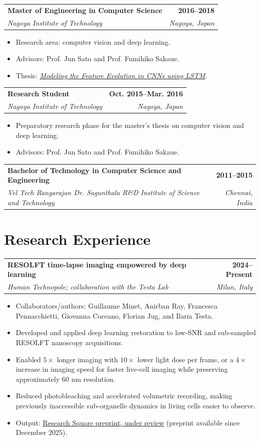 \documentclass[11pt,a4paper]{article}
\makeatletter
\newcommand{\entry}[4]{%
  \begin{tabularx}{\linewidth}{@{}>{\raggedright\arraybackslash}X r@{}}
    \textbf{#1} & \textbf{#2} \\
    \textit{#3} & \textit{#4}
  \end{tabularx}\vspace{-2pt}
}
\makeatother
\begin{document}
\entry{Master of Engineering in Computer Science}{2016--2018}{Nagoya Institute of Technology}{Nagoya, Japan}
\begin{itemize}
  \item Research area: computer vision and deep learning.
  \item Advisors: Prof. Jun Sato and Prof. Fumihiko Sakaue.
  \item Thesis: \href{https://drive.google.com/file/d/1A7Gm2RS3L8SPyb9G9Ey5O350kh7DYZKk/view}{\textit{Modeling the Feature Evolution in CNNs using LSTM}}.
\end{itemize}

\entry{Research Student}{Oct. 2015--Mar. 2016}{Nagoya Institute of Technology}{Nagoya, Japan}
\begin{itemize}
  \item Preparatory research phase for the master's thesis on computer vision and deep learning.
  \item Advisors: Prof. Jun Sato and Prof. Fumihiko Sakaue.
\end{itemize}

\entry{Bachelor of Technology in Computer Science and Engineering}{2011--2015}{Vel Tech Rangarajan Dr. Sagunthala R\&D Institute of Science and Technology}{Chennai, India}

\section*{Research Experience}
\entry{RESOLFT time-lapse imaging empowered by deep learning}{2024--Present}{Human Technopole; collaboration with the Testa Lab}{Milan, Italy}
\begin{itemize}
  \item Collaborators/authors: Guillaume Minet, Anirban Ray, Francesca Pennacchietti, Giovanna Coceano, Florian Jug, and Ilaria Testa.
  \item Developed and applied deep learning restoration to low-SNR and sub-sampled RESOLFT nanoscopy acquisitions.
  \item Enabled $5\times$ longer imaging with $10\times$ lower light dose per frame, or a $4\times$ increase in imaging speed for faster live-cell imaging while preserving approximately 60 nm resolution.
  \item Reduced photobleaching and accelerated volumetric recording, making previously inaccessible sub-organelle dynamics in living cells easier to observe.
  \item Output: \href{https://www.researchsquare.com/article/rs-8059028/v1}{Research Square preprint, under review} (preprint available since December 2025).
\end{itemize}
\end{document}
